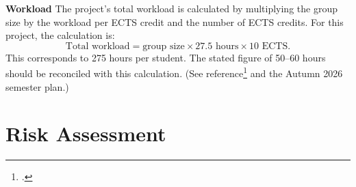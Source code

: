 \documentclass[11pt]{article}
\begin{document}
\textbf{Workload}
The project's total workload is calculated by multiplying the group size by the workload per ECTS credit and the number of ECTS credits. For this project, the calculation is:
\[
    \text{Total workload} = \text{group size} \times 27.5\text{ hours} \times 10\text{ ECTS}.
\]
This corresponds to 275 hours per student. The stated figure of 50--60 hours should be reconciled with this calculation. (See reference\footcite{via_se_syllabus2026} and the Autumn 2026 semester plan.)




\newpage
\section{Risk Assessment}
\end{document}
